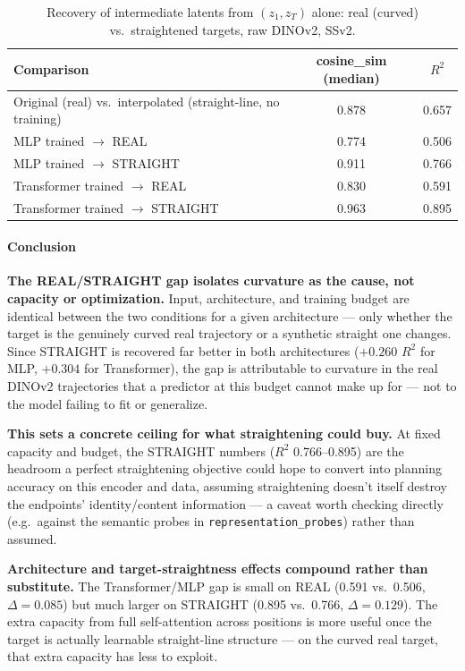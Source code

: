 \begin{table}[H]
\centering
\caption{Recovery of intermediate latents from $(z_1, z_T)$ alone: real (curved) vs.\
straightened targets, raw DINOv2, SSv2.}
\label{tab:straightening-poc}
\begin{tabular}{lcc}
\toprule
Comparison & cosine\_sim (median) & $R^2$ \\
\midrule
Original (real) vs.\ interpolated (straight-line, no training) & 0.878 & 0.657 \\
MLP trained $\to$ REAL & 0.774 & 0.506 \\
MLP trained $\to$ STRAIGHT & 0.911 & 0.766 \\
Transformer trained $\to$ REAL & 0.830 & 0.591 \\
Transformer trained $\to$ STRAIGHT & 0.963 & 0.895 \\
\bottomrule
\end{tabular}
\end{table}

\paragraph{Conclusion}

\textbf{The REAL/STRAIGHT gap isolates curvature as the cause, not capacity or
optimization.} Input, architecture, and training budget are identical between the two
conditions for a given architecture --- only whether the target is the genuinely curved
real trajectory or a synthetic straight one changes. Since STRAIGHT is recovered far
better in both architectures ($+0.260$ $R^2$ for MLP, $+0.304$ for Transformer), the gap
is attributable to curvature in the real DINOv2 trajectories that a predictor at this
budget cannot make up for --- not to the model failing to fit or generalize.

\textbf{This sets a concrete ceiling for what straightening could buy.} At fixed
capacity and budget, the STRAIGHT numbers ($R^2$ 0.766--0.895) are the headroom a
perfect straightening objective could hope to convert into planning accuracy on this
encoder and data, assuming straightening doesn't itself destroy the endpoints'
identity/content information --- a caveat worth checking directly (e.g.\ against the
semantic probes in \texttt{representation\_probes}) rather than assumed.

\textbf{Architecture and target-straightness effects compound rather than substitute.}
The Transformer/MLP gap is small on REAL (0.591 vs.\ 0.506, $\Delta=0.085$) but much
larger on STRAIGHT (0.895 vs.\ 0.766, $\Delta=0.129$). The extra capacity from full
self-attention across positions is more useful once the target is actually learnable
straight-line structure --- on the curved real target, that extra capacity has less to
exploit.

